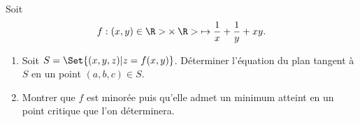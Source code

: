 \begin{enonce}
\begin{exercise}[ID={RMS135 E1329},subtitle={Centrale PSI 2024},tags={oraux},difficulty={}]
  Soit
  \begin{equation*}
  f:(x,y)\in{\R>}\times{\R>} \mapsto \frac{1}{x} + \frac{1}{y} + xy.
  \end{equation*}

  \begin{enumerate}
    \item Soit $S = \Set{(x,y,z) | z = f(x,y)}$.
      Déterminer l'équation du plan tangent à $S$ en un point $(a,b,c)\in S$.

    \item Montrer que $f$ est minorée puis qu'elle admet un minimum atteint en un point critique que l'on déterminera.
  \end{enumerate}

\end{exercise}
\begin{solution}
\end{solution}
\end{enonce}
